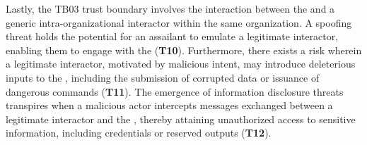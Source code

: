 \begin{newj}
Lastly, the TB03 trust boundary involves the interaction between the  and a generic intra-organizational interactor within the same organization. A spoofing threat holds the potential for an assailant to emulate a legitimate interactor, enabling them to engage with the  (\textbf{T10}). Furthermore, there exists a risk wherein a legitimate interactor, motivated by malicious intent, may introduce deleterious inputs to the , including the submission of corrupted data or issuance of dangerous commands (\textbf{T11}). The emergence of information disclosure threats transpires when a malicious actor intercepts messages exchanged between a legitimate interactor and the , thereby attaining unauthorized access to sensitive information, including credentials or reserved outputs (\textbf{T12}).

\end{newj}


